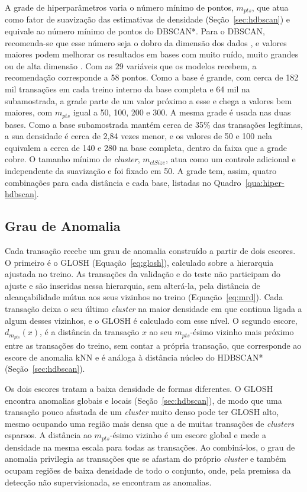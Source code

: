 \documentclass{uflamon}          %
\begin{document}
A grade de hiperparâmetros varia o número mínimo de pontos, $m_{pts}$, que atua como fator de suavização das estimativas de densidade (Seção~\ref{sec:hdbscan}) e equivale ao número mínimo de pontos do DBSCAN*. Para o DBSCAN, recomenda-se que esse número seja o dobro da dimensão dos dados , e valores maiores podem melhorar os resultados em bases com muito ruído, muito grandes ou de alta dimensão \cite{schubert2017}. Com as 29 variáveis que os modelos recebem, a recomendação corresponde a 58 pontos. Como a base é grande, com cerca de 182 mil transações em cada treino interno da base completa e 64 mil na subamostrada, a grade parte de um valor próximo a esse e chega a valores bem maiores, com $m_{pts}$ igual a 50, 100, 200 e 300. A mesma grade é usada nas duas bases. Como a base subamostrada mantém cerca de 35\% das transações legítimas, a sua densidade é cerca de 2,84 vezes menor, e os valores de 50 e 100 nela equivalem a cerca de 140 e 280 na base completa, dentro da faixa que a grade cobre. O tamanho mínimo de \textit{cluster}, $m_{clSize}$, atua como um controle adicional e independente da suavização \cite{campello2015} e foi fixado em 50. A grade tem, assim, quatro combinações para cada distância e cada base, listadas no Quadro~\ref{qua:hiper-hdbscan}.

\subsection{Grau de Anomalia}

Cada transação recebe um grau de anomalia construído a partir de dois escores. O primeiro é o GLOSH (Equação~\ref{eq:glosh}), calculado sobre a hierarquia ajustada no treino. As transações da validação e do teste não participam do ajuste e são inseridas nessa hierarquia, sem alterá-la, pela distância de alcançabilidade mútua aos seus vizinhos no treino (Equação~\ref{eq:mrd}). Cada transação deixa o seu último \textit{cluster} na maior densidade em que continua ligada a algum desses vizinhos, e o GLOSH é calculado com esse nível. O segundo escore, $d_{m_{pts}}(x)$, é a distância da transação $x$ ao seu $m_{pts}$-ésimo vizinho mais próximo entre as transações do treino, sem contar a própria transação, que corresponde ao escore de anomalia kNN \cite{ramaswamy2000} e é análoga à distância núcleo do HDBSCAN* (Seção~\ref{sec:hdbscan}).

Os dois escores tratam a baixa densidade de formas diferentes. O GLOSH encontra anomalias globais e locais (Seção~\ref{sec:hdbscan}), de modo que uma transação pouco afastada de um \textit{cluster} muito denso pode ter GLOSH alto, mesmo ocupando uma região mais densa que a de muitas transações de \textit{clusters} esparsos. A distância ao $m_{pts}$-ésimo vizinho é um escore global e mede a densidade na mesma escala para todas as transações. Ao combiná-los, o grau de anomalia privilegia as transações que se afastam do próprio \textit{cluster} e também ocupam regiões de baixa densidade de todo o conjunto, onde, pela premissa da detecção não supervisionada, se encontram as anomalias.
\end{document}
